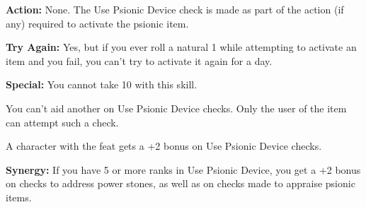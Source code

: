 \textbf{Action:} None. The Use Psionic Device check is made as part of the action (if any) required to activate the psionic item.

\textbf{Try Again:} Yes, but if you ever roll a natural 1 while attempting to activate an item and you fail, you can't try to activate it again for a day.

\textbf{Special:} You cannot take 10 with this skill.

You can't aid another on Use Psionic Device checks. Only the user of the item can attempt such a check.

A character with the  feat gets a +2 bonus on Use Psionic Device checks.

\textbf{Synergy:} If you have 5 or more ranks in Use Psionic Device, you get a +2 bonus on  checks to address power stones, as well as on  checks made to appraise psionic items.

